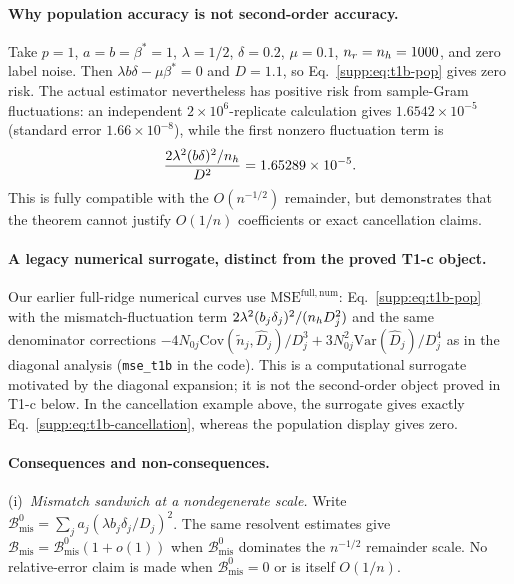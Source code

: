 \paragraph{Why population accuracy is not second-order accuracy.}
Take $p=1$, $a=b=\beta^*=1$, $\lambda=1/2$, $\delta=0.2$, $\mu=0.1$, $n_r=n_h=1000$, and zero label noise.
Then $\lambda b\delta-\mu\beta^*=0$ and $D=1.1$, so Eq.~\eqref{supp:eq:t1b-pop} gives zero risk.
The actual estimator nevertheless has positive risk from sample-Gram fluctuations: an independent $2\times10^6$-replicate calculation gives $1.6542\times10^{-5}$ (standard error $1.66\times10^{-8}$), while the first nonzero fluctuation term is
\begin{equation}
  \frac{2\lambda^2(b\delta)^2/n_h}{D^2}=1.65289\times10^{-5}.
  \label{supp:eq:t1b-cancellation}
\end{equation}
This is fully compatible with the $O(n^{-1/2})$ remainder, but demonstrates that the theorem cannot justify $O(1/n)$ coefficients or exact cancellation claims.

\paragraph{A legacy numerical surrogate, distinct from the proved T1-c object.}
Our earlier full-ridge numerical curves use $\mathrm{MSE}^{\mathrm{full,num}}$: Eq.~\eqref{supp:eq:t1b-pop} with the mismatch-fluctuation term $2\lambda^2(b_j\delta_j)^2/(n_h D_j^2)$ and the same denominator corrections $-4N_{0j}\mathrm{Cov}(\tilde n_j,\hat D_j)/D_j^3+3N_{0j}^2\mathrm{Var}(\hat D_j)/D_j^4$ as in the diagonal analysis (\texttt{mse\_t1b} in the code).
This is a computational surrogate motivated by the diagonal expansion; it is not the second-order object proved in T1-c below.
In the cancellation example above, the surrogate gives exactly Eq.~\eqref{supp:eq:t1b-cancellation}, whereas the population display gives zero.

\paragraph{Consequences and non-consequences.}
(i)~\emph{Mismatch sandwich at a nondegenerate scale.}
Write $\mathcal B_{\mathrm{mis}}^0=\sum_j a_j(\lambda b_j\delta_j/D_j)^2$.
The same resolvent estimates give $\mathcal B_{\mathrm{mis}}=\mathcal B_{\mathrm{mis}}^0(1+o(1))$ when $\mathcal B_{\mathrm{mis}}^0$ dominates the $n^{-1/2}$ remainder scale.
No relative-error claim is made when $\mathcal B_{\mathrm{mis}}^0=0$ or is itself $O(1/n)$.

